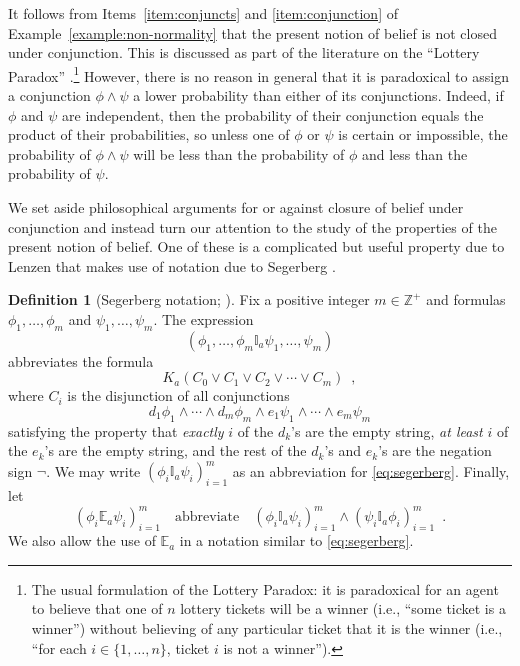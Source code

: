 \documentclass[12pt]{article}
\theoremstyle{definition}
\newtheorem{definition}[theorem]{Definition}
\newcommand{\Int}{\mathbb{Z}}  %
\begin{document}
It follows from Items~\ref{item:conjuncts} and \ref{item:conjunction}
of Example~\ref{example:non-normality} that the present notion of
belief is not closed under conjunction.  This is discussed as part of
the literature on the ``Lottery Paradox''
\cite{Kyburg1961:patlorb}.\footnote{The usual formulation of the
  Lottery Paradox: it is paradoxical for an agent to believe that one
  of $n$ lottery tickets will be a winner (i.e., ``some ticket is a
  winner'') without believing of any particular ticket that it is the
  winner (i.e., ``for each $i\in\{1,\dots,n\}$, ticket $i$ is not a
  winner'').}  However, there is no reason in general that it is
paradoxical to assign a conjunction $\phi \land \psi$ a lower
probability than either of its conjunctions.  Indeed, if $\phi$ and
$\psi$ are independent, then the probability of their conjunction
equals the product of their probabilities, so unless one of $\phi$ or
$\psi$ is certain or impossible, the probability of $\phi \land \psi$
will be less than the probability of $\phi$ and less than the
probability of $\psi$.

We set aside philosophical arguments for or against closure of belief
under conjunction and instead turn our attention to the study of the
properties of the present notion of belief.  One of these is a
complicated but useful property due to Lenzen \cite{Lenzen2003:kbasp}
that makes use of notation due to Segerberg
\cite{Segerberg1971:qpiams}.

\begin{definition}[Segerberg notation; \cite{Segerberg1971:qpiams}]
  \label{definition:segerberg-notation}
  Fix a positive integer $m\in\Int^+$ and formulas
  $\phi_1,\dots,\phi_m$ and $\psi_1,\dots,\psi_m$.  The expression
  \begin{equation}
    (\phi_1,\dots,\phi_m\mathbb{I}_a\psi_1,\dots,\psi_m)
    \label{eq:segerberg}
  \end{equation}
  abbreviates the formula
  \[
  K_a(C_0\lor C_1\lor C_2 \lor \cdots \lor C_m)\enspace,
  \]
  where $C_i$ is the disjunction of all conjunctions
  \[
  d_1\phi_1\land\cdots\land d_m\phi_m \land
  e_1\psi_1\land\cdots\land e_m\psi_m
  \]
  satisfying the property that \emph{exactly} $i$ of the $d_k$'s are the
  empty string, \emph{at least} $i$ of the $e_k$'s are the empty string, and
  the rest of the $d_k$'s and $e_k$'s are the negation sign $\lnot$.
  We may write $(\phi_i\mathbb{I}_a\psi_i)_{i=1}^m$ as an
  abbreviation for \eqref{eq:segerberg}.  Finally, let
  \[
  (\phi_i\mathbb{E}_a\psi_i)_{i=1}^m
  \quad\text{abbreviate}\quad
  (\phi_i\mathbb{I}_a\psi_i)_{i=1}^m\land(\psi_i\mathbb{I}_a\phi_i)_{i=1}^m
  \enspace.
  \]
  We also allow the use of $\mathbb{E}_a$ in a notation similar to 
  \eqref{eq:segerberg}.
\end{definition}
\end{document}
